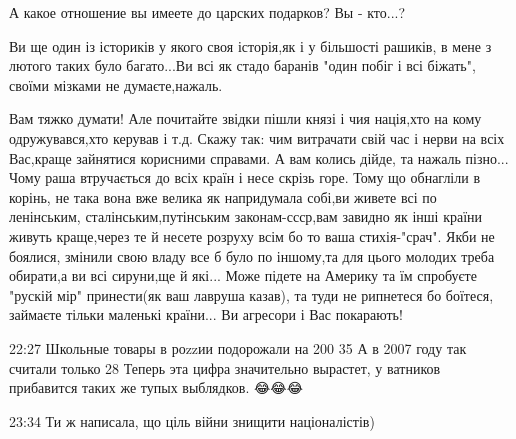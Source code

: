 {А какое отношение вы имеете до царских подарков? Вы - кто...?


Ви ще один із істориків у якого своя історія,як і у більшості рашиків, в мене з
лютого таких було багато...Ви всі як стадо баранів "один побіг і всі біжать",
своїми мізками не думаєте,нажаль.

Вам тяжко думати!
Але почитайте звідки пішли князі і чия нація,хто на кому одружувався,хто керував і т.д.
Скажу так: чим витрачати свій час і нерви на всіх Вас,краще зайнятися корисними справами.
А вам колись дійде, та нажаль пізно...
Чому раша втручається до всіх країн і несе скрізь горе.
Тому що обнагліли в корінь, не така вона вже велика як напридумала собі,ви живете всі по ленінським, сталінським,путінським законам-ссср,вам завидно як інші країни живуть краще,через те й несете розруху всім бо то ваша стихія-"срач".
Якби не боялися, змінили свою владу все б було по іншому,та для цього молодих треба обирати,а ви всі сируни,ще й які...
Може підете на Америку та їм спробуєте "рускій мір" принести(як ваш лавруша казав), та туди не рипнетеся бо боїтеся, займаєте тільки маленькі країни...
Ви агресори і Вас покарають!

22:27
Школьные товары в роzzии подорожали на 200%
35%
А в 2007 году так считали только 28%
Теперь эта цифра значительно вырастет, у ватников прибавится таких же тупых выблядков.
😂😂😂

23:34
Ти ж написала, що ціль війни знищити націоналістів)

}
